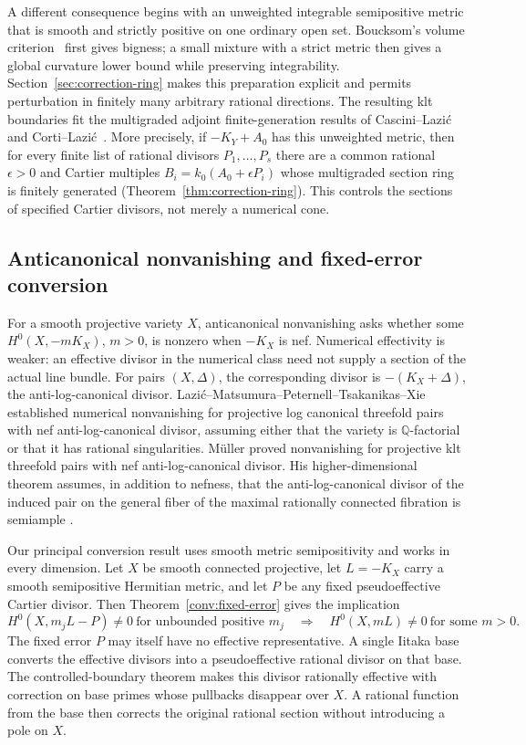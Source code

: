 A different consequence begins with an unweighted integrable
semipositive metric that is smooth and strictly positive on one ordinary
open set.
Boucksom's volume criterion~\cite{Boucksom2002} first gives bigness;
a small mixture with a strict metric then gives a global curvature
lower bound while preserving integrability.  Section~\ref{sec:correction-ring}
makes this preparation explicit and permits perturbation in finitely
many arbitrary rational directions.  The resulting klt boundaries
fit the multigraded adjoint finite-generation results of
Cascini--Lazi\'c~\cite{CasciniLazic2012} and
Corti--Lazi\'c~\cite[Theorem 3.2(1)]{CortiLazic2013}.
More precisely, if $-K_Y+A_0$ has this unweighted metric, then for
every finite list of rational divisors $P_1,\ldots,P_s$ there are a
common rational $\epsilon>0$ and Cartier multiples
$B_i=k_0(A_0+\epsilon P_i)$ whose multigraded section ring is finitely
generated (Theorem~\ref{thm:correction-ring}).  This controls the
sections of specified Cartier divisors, not merely a numerical cone.

\subsection{Anticanonical nonvanishing and fixed-error conversion}

For a smooth projective variety $X$, anticanonical nonvanishing asks
whether some $H^0(X,-mK_X)$, $m>0$, is nonzero when $-K_X$ is nef.
Numerical effectivity is weaker: an effective divisor in the numerical
class need not supply a section of the actual line bundle.
For pairs $(X,\Delta)$, the corresponding divisor is
$-(K_X+\Delta)$, the anti-log-canonical divisor.
Lazi\'c--Matsumura--Peternell--Tsakanikas--Xie
\cite[Theorem~A]{LMPTX2023} established numerical nonvanishing for
projective log canonical threefold pairs with nef anti-log-canonical
divisor, assuming either that the variety is $\mathbb Q$-factorial
or that it has rational singularities.  M\"uller
\cite[Corollary~B]{Muller2025} proved nonvanishing for projective klt
threefold pairs with nef anti-log-canonical divisor.  His higher-dimensional
theorem assumes, in addition to nefness, that the anti-log-canonical
divisor of the induced pair on the general fiber of the maximal
rationally connected fibration is semiample \cite[Theorem~A]{Muller2025}.

Our principal conversion result uses smooth metric semipositivity and
works in every dimension.  Let $X$ be smooth connected projective,
let $L=-K_X$ carry a smooth semipositive Hermitian metric, and let $P$
be any fixed pseudoeffective Cartier divisor.  Then
Theorem~\ref{conv:fixed-error} gives the implication
\[
 H^0(X,m_jL-P)\ne0\ \text{for unbounded positive }m_j
 \quad\Longrightarrow\quad
 H^0(X,mL)\ne0\ \text{for some }m>0.
\]
The fixed error $P$ may itself have no effective representative.
A single Iitaka base converts the effective divisors into a
pseudoeffective rational divisor on that base.  The controlled-boundary
theorem makes this divisor rationally effective with correction on
base primes whose pullbacks disappear over $X$.  A rational function
from the base then corrects the original rational section without
introducing a pole on $X$.

